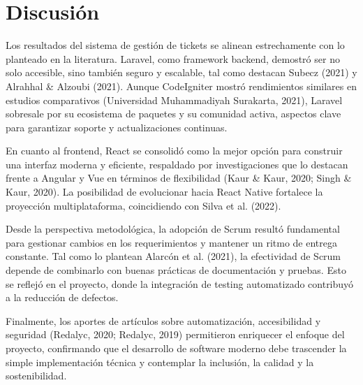 \section{Discusión}
Los resultados del sistema de gestión de tickets se alinean estrechamente con lo planteado en la literatura. Laravel, como framework backend, demostró ser no solo accesible, sino también seguro y escalable, tal como destacan Subecz (2021) y Alrahhal & Alzoubi (2021). Aunque CodeIgniter mostró rendimientos similares en estudios comparativos (Universidad Muhammadiyah Surakarta, 2021), Laravel sobresale por su ecosistema de paquetes y su comunidad activa, aspectos clave para garantizar soporte y actualizaciones continuas.

En cuanto al frontend, React se consolidó como la mejor opción para construir una interfaz moderna y eficiente, respaldado por investigaciones que lo destacan frente a Angular y Vue en términos de flexibilidad (Kaur & Kaur, 2020; Singh & Kaur, 2020). La posibilidad de evolucionar hacia React Native fortalece la proyección multiplataforma, coincidiendo con Silva et al. (2022).

Desde la perspectiva metodológica, la adopción de Scrum resultó fundamental para gestionar cambios en los requerimientos y mantener un ritmo de entrega constante. Tal como lo plantean Alarcón et al. (2021), la efectividad de Scrum depende de combinarlo con buenas prácticas de documentación y pruebas. Esto se reflejó en el proyecto, donde la integración de testing automatizado contribuyó a la reducción de defectos.

Finalmente, los aportes de artículos sobre automatización, accesibilidad y seguridad (Redalyc, 2020; Redalyc, 2019) permitieron enriquecer el enfoque del proyecto, confirmando que el desarrollo de software moderno debe trascender la simple implementación técnica y contemplar la inclusión, la calidad y la sostenibilidad.